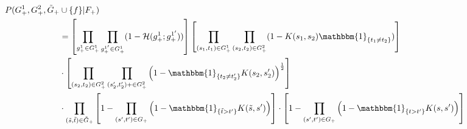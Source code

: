 \documentclass[12pt]{article}
\begin{document}
\begin{align*}
P(G_+^1, G_+^2 , \tilde{G}_+&\cup \{f\} | F_+) \\
& = \left[ \prod_{g^1_+ \in G^1_+} \prod_{g^{1'}_+ \in G^1_+} ( 1- \mH (g_+^1 ; g^{1'}_+) ) \right]
\left[ \prod_{(s_1, t_1) \in G_+^1}  \prod_{(s_2, t_2) \in G_+^2} (1 - K(s_1, s_2) \mathbbm{1}_{\{t_1 \neq t_2 \}})\right] \\
&\cdot \left[ \prod_{(s_2, t_2) \in G^2_+} \prod_{(s'_2, t'_2)+ \in G^2_+} \left( 1- \mathbbm{1}_{\{ t_2 \neq t'_2 \}} K(s_2, s'_2) \right)^{\frac{1}{2}} \right] \\
&\cdot \prod_{(\tilde{s}, \tilde{t}) \in \tilde{G}_+} \left[ 1 - \prod_{(s', t') \in G_+}  \left(1 - \mathbbm{1}_{\{ \tilde{t} > t' \} } K(\tilde{s}, s')\right)  \right] \cdot \left[ 1 - \prod_{(s', t') \in G_+}  \left(1 - \mathbbm{1}_{\{ t > t' \} } K(s, s')\right)  \right] \\
\end{align*}
\end{document}
